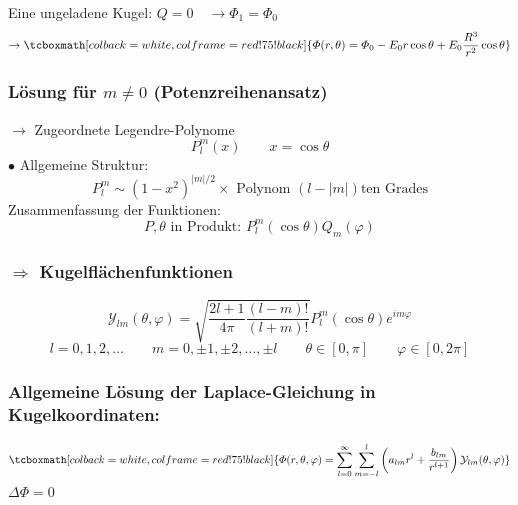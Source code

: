 \documentclass[titlepage,11pt,a4paper,ngerman]{report}
\renewcommand{\Phi}{\varPhi}
\renewcommand{\vec}[1]{\boldsymbol{#1}}
\newcommand{\rmbox}[1]{\tcboxmath[colback=white,colframe=red!75!black]{#1}}
\begin{document}
\begin{minipage}{.3\linewidth}
	\centering
\end{minipage}
Eine ungeladene Kugel: $ Q = 0 \quad \rightarrow \Phi_1 = \Phi_0 $
\begin{equation*}
\rightarrow \rmbox{\Phi(r,\theta) = \Phi_0 - E_0 r \cos\theta + E_0 \frac{R^3}{r^2} \cos \theta}
\end{equation*}

\subsubsection{Lösung für $ m \neq 0 $ (Potenzreihenansatz)}

$\rightarrow$ Zugeordnete Legendre-Polynome
$$P^m_l (x) \qquad x = \cos\theta$$
$\bullet$ Allgemeine Struktur:
$$P_l^m \sim (1-x^2)^{|m|/2} \times \textrm{ Polynom } (l-|m|)\textrm{ten Grades}$$
Zusammenfassung der Funktionen:
$$ P, \theta \textrm{ in Produkt: } P_l^m (\cos\theta) Q_m (\varphi)$$
\subsubsection{$\Rightarrow$ Kugelflächenfunktionen}
$$\mathcal Y_{lm} (\theta,\varphi) = \sqrt{\frac{2l+1}{4\pi}\frac{(l-m)!}{(l+m)!}} P_l^m (\cos\theta)e^{im\varphi}$$
$$l = 0,1,2,\dots \qquad m = 0,\pm 1,\pm 2,\dots,\pm l \qquad \theta \in [0,\pi] \qquad \varphi \in [0,2\pi]$$


\subsubsection{Allgemeine Lösung der Laplace-Gleichung in Kugelkoordinaten:}

\begin{equation*}
\rmbox{\Phi(r,\theta,\varphi) = \sum_{l=0}^{\infty} \sum_{m=-l}^{l} \left(a_{lm} r^l + \frac{b_{lm}}{r^{l+1}}\right) \mathcal{Y}_{lm} (\theta,\varphi)}
\end{equation*}
$ \Delta \Phi = 0 $
\end{document}
